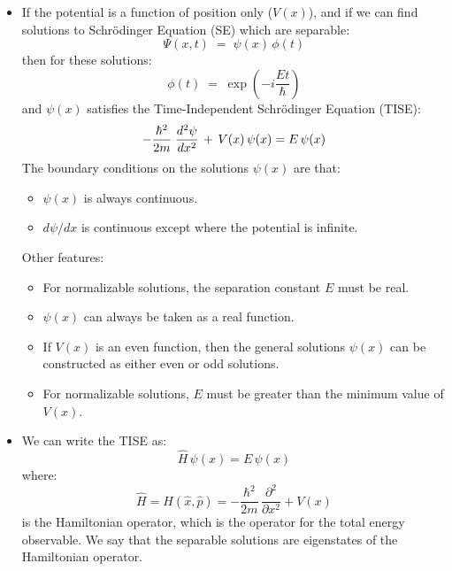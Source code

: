 \documentclass[12pt]{book}
\begin{document}
\begin{itemize}

\item If the potential is a function of position only ($V(x)$), and if we can find solutions to Schr\"odinger Equation (SE) which are separable:
\begin{equation}
\Psi(x,t) \; = \; \psi(x) \,\phi(t)
\end{equation}
then for these solutions:
\begin{equation}
\phi(t) \; = \; \exp\left( -i\frac{Et}{\hbar}\right)
\end{equation}
and $\psi(x)$ satisfies the Time-Independent Schr\"odinger Equation (TISE):
\begin{equation}
- \frac{\hbar^2}{2 m} \;  \frac{d^2 \psi}{dx^2}  \, + \, V(x) \, \psi(x) = E \, \psi(x)\\
\end{equation}
The boundary conditions on the solutions $\psi(x)$ are that:
\begin{itemize}
\item $\psi(x)$ is always continuous.
\item $d\psi/dx$ is continuous except where the potential is infinite.
\end{itemize}
Other features:
\begin{itemize}
\item For normalizable solutions, the separation constant $E$ must be real.
\item $\psi(x)$ can always be taken as a real function.
\item If $V(x)$ is an even function, then the general solutions $\psi(x)$ can be constructed as either even or odd solutions.
\item For normalizable solutions, $E$ must be greater than the minimum value of $V(x)$.
\end{itemize}
\item We can write the TISE as:
\begin{equation}
\hat{H} \, \psi(x) = E \, \psi(x)
\end{equation}
where:
\begin{equation}
\hat{H} = H(\hat{x}, \hat{p})= -\frac{\hbar^2}{2m}\,\frac{\partial^2}{\partial x^2} + V(x)
\end{equation}
is the Hamiltonian operator, which is the operator for the total energy observable.  We say that the separable solutions are eigenstates of the Hamiltonian operator.


\end{itemize}
\end{document}
